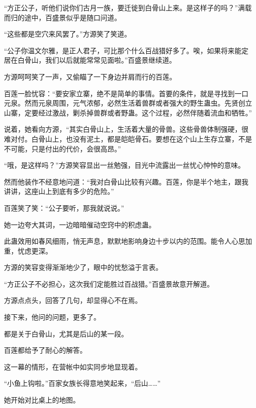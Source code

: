 \begin{this_body}
“方正公子，听他们说你们古月一族，要迁徙到白骨山上来。是这样子的吗？”满载而归的途中，百盛景似乎是随口问道。

“这些都是空穴来风罢了。”方源笑了笑道。

“公子你温文尔雅，是正人君子，可比那个什么百战猎好多了。唉，如果将来能定居在白骨山，我们以后就能常常见面啦。”百盛景继续道。

方源呵呵笑了一声，又偷瞄了一下身边并肩而行的百莲。

百莲一脸忧容：“要安家立寨，绝不是简单的事情。首要的条件，就是寻找到一口元泉。然而元泉周围，元气浓郁，必然生活着兽群或者强大的野生蛊虫。先贤创立山寨，定要经过激战，剿杀掉兽群或者野蛊。这个过程，必然伴随着流血和牺牲。”

说着，她看向方源，“其实白骨山上，生活着大量的骨兽。这些骨兽体制强硬，很难对付。白骨山上，也没有泥土，都是皑皑骨石。要想在这个山上生存立寨，不是不可能，只是付出的代价，会很高昂。”

“哦，是这样吗？”方源笑容显出一丝勉强，目光中流露出一丝忧心忡忡的意味。

然而他装作不经意地问道：“我对白骨山比较有兴趣。百莲，你是半个地主，跟我讲讲，这座山上到底有多少的危险。”

百莲笑了笑：“公子要听，那我就说说。”

她一边夸大其词，一边暗暗催动空窍中的积虑蛊。

此蛊效用如春风细雨，悄无声息，默默地影响身边十步以内的范围。能令人心思加重，忧虑更深。

方源的笑容变得渐渐地少了，眼中的忧愁溢于言表。

“方正公子不必担心，这次我们定能胜过百战猎。”百盛景故意开解道。

方源点点头，回答了几句，却显得心不在焉。

接下来，他问的问题，更多了。

都是关于白骨山，尤其是后山的某一段。

百莲都给予了耐心的解答。

这一幕的情形，在营帐中如实同步地显现着。

“小鱼上钩啦。”百家女族长得意地笑起来，“后山……”

她开始对比桌上的地图。

\end{this_body}

